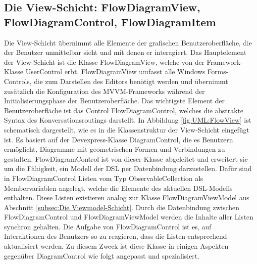 \subsection[Die View-Schicht]{Die View-Schicht: FlowDiagramView, FlowDiagramControl, FlowDiagramItem}
Die View-Schicht übernimmt alle Elemente der grafischen Benutzeroberfläche, die der Benutzer unmittelbar sieht und mit denen er interagiert. Das Hauptelement der View-Schicht ist die Klasse FlowDiagramView, welche von der Framework-Klasse UserControl erbt. FlowDiagramView umfasst alle Windows Forms-Controls, die zum Darstellen des Editors benötigt werden und übernimmt zusätzlich die Konfiguration des MVVM-Frameworks während der Initialisierungsphase der Benutzeroberfläche.
\newline  
Das wichtigste Element der Benutzeroberfläche ist das Control FlowDiagramControl, welches  die abstrakte Syntax des Konversationsroutings darstellt. In Abbildung \ref{fig:UML:FlowView} ist schematisch dargestellt, wie es in die Klassenstruktur der View-Schicht eingefügt ist. Es basiert auf der Devexpress-Klasse DiagramControl, die es Benutzern ermöglicht, Diagramme mit geometrischen Formen und Verbindungen zu gestalten. FlowDiagramControl ist von dieser Klasse abgeleitet und erweitert sie um die Fähigkeit, ein Modell der DSL per Datenbindung darzustellen. Dafür sind in FlowDiagramControl Listen vom Typ ObservableCollection als Membervariablen angelegt, welche die Elemente des aktuellen DSL-Modells enthalten. Diese Listen existieren analog zur Klasse FlowDiagramViewModel aus Abschnitt \ref{subsec:Die Viewmodel-Schicht}. Durch die Datenbindung zwischen FlowDiagramControl und FlowDiagramViewModel werden die Inhalte aller Listen synchron gehalten. Die Aufgabe von FlowDiagramControl ist es, auf Interaktionen des Benutzers so zu reagieren, dass die Listen entsprechend aktualisiert werden. Zu diesem Zweck ist diese Klasse in einigen Aspekten gegenüber DiagramControl wie folgt angepasst und spezialisiert.
\newline

